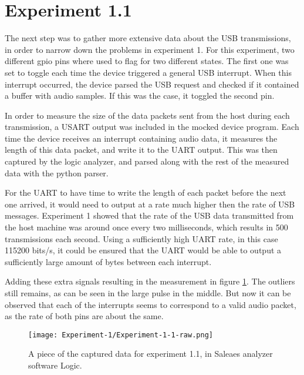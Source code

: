 \section{Experiment 1.1}

The next step was to gather more extensive data about the USB
transmissions, in order to narrow down the problems in experiment 1.
For this experiment, two different \acrshort{gpio} pins where used to
flag for two different states. The first one was set to toggle each
time the device triggered a general USB interrupt. When this interrupt
occurred, the device parsed the USB request and checked if it
contained a buffer with audio samples. If this was the case, it
toggled the second pin.

In order to measure the size of the data packets sent from the host
during each transmission, a USART output was included in the mocked
device program. Each time the device receives an interrupt containing
audio data, it measures the length of this data packet, and write it
to the UART output. This was then captured by the logic analyzer, and
parsed along with the rest of the measured data with the python
parser.


For the UART to have time to write the length of each packet before
the next one arrived, it would need to output at a rate much higher
then the rate of USB messages. Experiment 1 showed that the rate of
the USB data transmitted from the host machine was around once every
two milliseconds, which results in 500 transmissions each second.
Using a sufficiently high UART rate, in this case 115200 bits/s, it
could be ensured that the UART would be able to output a sufficiently
large amount of bytes between each interrupt. 


Adding these extra signals resulting in the measurement in figure
\ref{fig:experiment-1-1-raw}. The outliers still remains, as can be
seen in the large pulse in the middle. But now it can be observed that
each of the interrupts seems to correspond to a valid audio packet, as
the rate of both pins are about the same. 

\begin{figure}[h]
	\caption{A piece of the captured data for experiment 1.1, in Saleaes
	analyzer software Logic.}
	\centering
	\texttt{[image: Experiment-1/Experiment-1-1-raw.png]}
	\label{fig:experiment-1-1-raw}
\end{figure}

